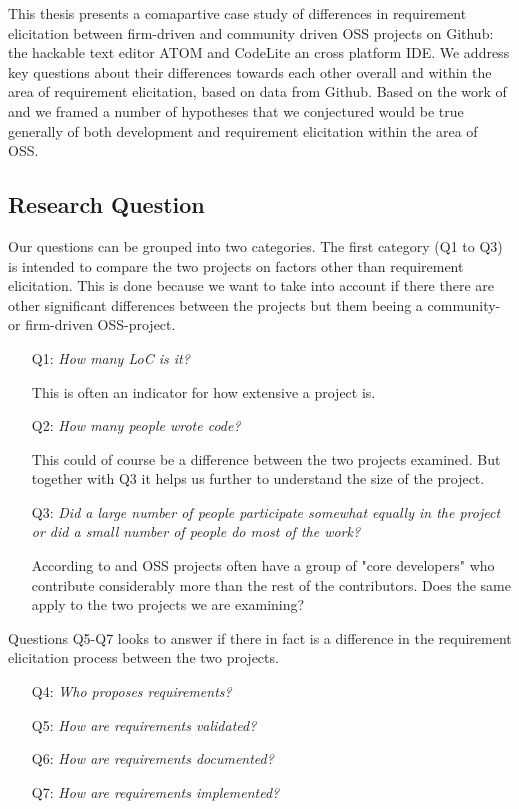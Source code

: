 \documentclass[a4paper,11pt]{article}
\begin{document}
{This thesis presents a comapartive case study of differences in requirement elicitation between firm-driven and community driven OSS projects on Github: the hackable text editor ATOM and CodeLite an cross platform IDE. We address key questions about their differences towards each other overall and within the area of requirement elicitation, based on data from Github. Based on the work of \cite{Mockus2002a} and \cite{Noll} we framed a number of hypotheses that we conjectured would be true generally of both development and requirement elicitation within the area of OSS. 


\subsection{Research Question}
Our questions can be grouped into two categories. The first category (Q1 to Q3) is intended to compare the two projects on factors other than requirement elicitation. This is done because we want to take into account if there there are other significant differences between the projects but them beeing a community- or firm-driven OSS-project.
\begin{itemize}
	\item[Q1:]\emph{How many LoC is it?}
	
	This is often an indicator for how extensive a project is.
	\item[Q2:]\emph{How many people wrote code?}
	
	This could of course be a difference between the two projects examined. But together with Q3 it helps us further to understand the size of the project.
	\item[Q3:]\emph{Did a large number of people participate somewhat equally in the project or did a small number of people do most of the work?}
	
	According to \cite{Noll} and \cite{Mockus2002a} OSS projects often have a group of "core developers" who contribute considerably more than the rest of the contributors. Does the same apply to the two projects we are examining?
\end{itemize}
Questions Q5-Q7 looks to answer if there in fact is a difference in the requirement elicitation process between the two projects.
\begin{itemize}
	\item[Q4:]\emph{Who proposes requirements?}
	\item[Q5:]\emph{How are requirements validated?}
	\item[Q6:]\emph{How are requirements documented?}
	\item[Q7:]\emph{How are requirements implemented?}
\end{itemize}

}
\end{document}
